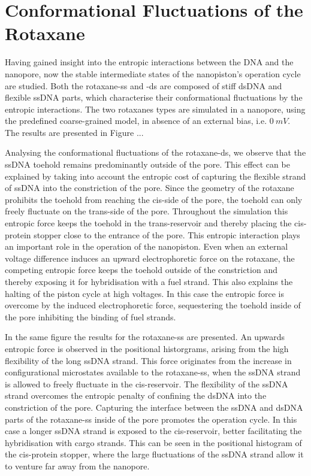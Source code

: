 \newpage
\section{Conformational Fluctuations of the Rotaxane}

Having gained insight into the entropic interactions between the DNA and the
nanopore, now the stable intermediate states of the nanopiston's operation cycle are
studied. Both the rotaxane-ss and -ds are composed of stiff dsDNA and flexible ssDNA
parts, which characterise their conformational fluctuations by the entropic interactions.
The two rotaxanes types are simulated in a nanopore, using the predefined coarse-grained
model, in absence of an external bias, i.e.  $0\ mV$. The results are presented in Figure
...

Analysing the conformational fluctuations of the rotaxane-ds, we observe that the ssDNA
toehold remains predominantly outside of the pore. This effect can be explained by taking
into account the entropic cost of capturing the flexible strand of ssDNA into the
constriction of the pore. Since the geometry of the rotaxane prohibits the toehold from
reaching the cis-side of the pore, the toehold can only freely fluctuate on the
trans-side of the pore. Throughout the simulation this entropic force keeps the toehold
in the trans-reservoir and thereby placing the cis-protein stopper close to the entrance
of the pore. This entropic interaction plays an important role in the operation of the
nanopiston. Even when an external voltage difference induces an upward electrophoretic
force on the rotaxane, the competing entropic force keeps the toehold outside of the
constriction and thereby exposing it for hybridisation with a fuel strand. This also
explains the halting of the piston cycle at high voltages. In this case the entropic
force is overcome by the induced electrophoretic force, sequestering the toehold inside
of the pore inhibiting the binding of fuel strands.

In the same figure the results for the rotaxane-ss are presented. An upwards entropic
force is observed in the positional historgrams, arising from the high flexibility of the
long ssDNA strand. This force originates from the increase in configurational microstates
available to the rotaxane-ss, when the ssDNA strand is allowed to freely fluctuate in the
cis-reservoir. The flexibility of the ssDNA strand overcomes the entropic penalty of
confining the dsDNA into the constriction of the pore. Capturing the interface between
the ssDNA and dsDNA parts of the rotaxane-ss inside of the pore promotes the
operation cycle. In this case a longer ssDNA strand is exposed to the cis-reservoir,
better facilitating the hybridisation with cargo strands. This can be seen in the
positional histogram of the cis-protein stopper, where the large fluctuations of the
ssDNA strand allow it to venture far away from the nanopore.

